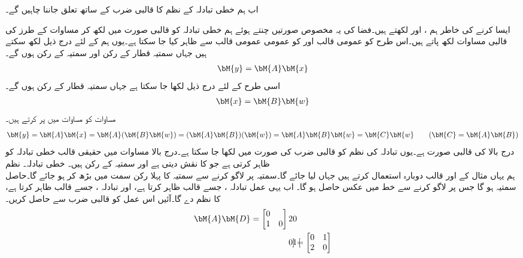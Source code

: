 اب ہم خطی تبادلہ کے نظم کا قالبی ضرب کے ساتھ تعلق جاننا چاہیں گے۔

ایسا کرنے کی خاطر ہم ،  اور  لکھتے ہیں۔فضا کی یہ مخصوص صورتیں چنتے ہوئے ہم خطی تبادلہ کو قالبی صورت میں لکھ  کر مساوات  کے طرز کی  قالبی مساوات لکھ پاتے ہیں۔اس طرح  کو  عمومی قالب 
 اور  کو عمومی  عمومی قالب  سے ظاہر کیا جا سکتا ہے۔یوں ہم  کے لئے درج ذیل لکھ سکتے ہیں جہاں سمتیہ قطار  کے  رکن اور سمتیہ  کے  رکن ہوں گے۔
\begin{align}\label{مساوات_الجبرا_نظم_استعمال_الف}
\bM{y}=\bM{A}\bM{x}
\end{align}
اسی طرح  کے لئے درج ذیل لکھا جا سکتا ہے جہاں سمتیہ قطار  کے  رکن ہوں گے۔
\begin{align}\label{مساوات_الجبرا_نظم_استعمال_ب}
\bM{x}=\bM{B}\bM{w}
\end{align}
مساوات  کو مساوات  میں پر کرتے ہیں۔
\begin{align}\label{مساوات_الجبرا_نظم_کی_تعریف}
\bM{y}=\bM{A}\bM{x}=\bM{A}(\bM{B}\bM{w})=(\bM{A}\bM{B})(\bM{w})=\bM{A}\bM{B}\bM{w}=\bM{C}\bM{w}\quad\quad  (\bM{C}=\bM{A}\bM{B})
\end{align}
درج بالا   کی قالبی صورت ہے۔یوں تبادلہ کی نظم کو قالبی ضرب کی صورت میں لکھا جا سکتا ہے۔درج بالا مساوات میں حقیقی  قالب  خطی تبادلہ  کو ظاہر کرتی ہے جو  کا نقش  دیتی ہے اور سمتیہ  کے  رکن ہیں۔
\quad خطی تبادلہ۔ نظم\\
ہم یہاں مثال  کے  اور  قالب دوبارہ استعمال کرتے ہیں جہاں  لیا جائے گا۔سمتیہ  پر  لاگو کرنے سے  سمتیہ کا پہلا رکن  سمت میں بڑھ کر   ہو جائے گا۔حاصل سمتیہ  ہو گا جس پر  لاگو کرنے سے خط  میں عکس  حاصل ہو گا۔ اب یہی عمل تبادلہ ، جسے قالب  ظاہر کرتا ہے،  اور تبادلہ ، جسے  قالب  ظاہر کرتا ہے، کا نظم  دے گا۔آئیں اس عمل کو قالبی ضرب سے حاصل کریں۔
\begin{align*}
\bM{A}\bM{D}=\begin{bmatrix*}[r]0&\\1&0  \end{bmatrix*} 2&0\\0&1\begin{bmatrix*}[r]  \end{bmatrix*}=\begin{bmatrix*}[r] 0&1\\2&0 \end{bmatrix*}
\end{align*}
